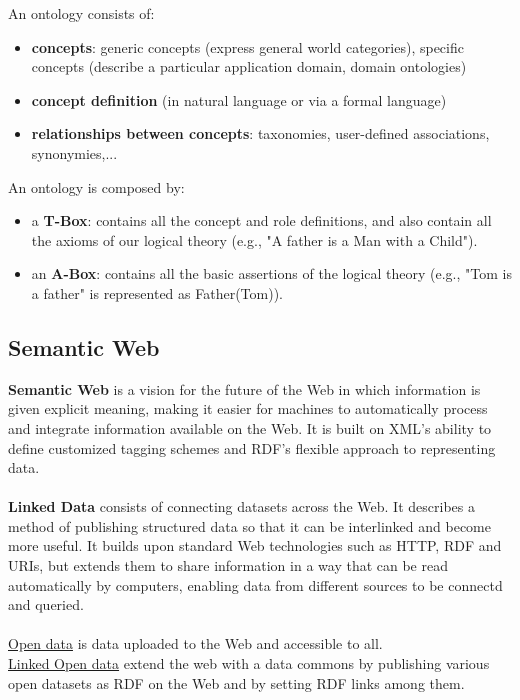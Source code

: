 \documentclass[10pt,a4paper]{article}
\newcommand{\nline}{\\~\\}
\begin{document}
An ontology consists of:
\begin{itemize}
	\item \textbf{concepts}: generic concepts (express general world categories), specific concepts (describe a particular application domain, domain ontologies)
	\item \textbf{concept definition} (in natural language or via a formal language)
	\item \textbf{relationships between concepts}: taxonomies, user-defined associations, synonymies,...
\end{itemize}
An ontology is composed by:
\begin{itemize}
	\item a \textbf{T-Box}: contains all the concept and role definitions, and also contain all the axioms of our logical theory (e.g., "A father is a Man with a Child").
	\item an \textbf{A-Box}: contains all the basic assertions of the logical theory (e.g., "Tom is a father" is represented as Father(Tom)).
\end{itemize}
\pagebreak
\subsection{Semantic Web}
\textbf{Semantic Web} is a vision for the future of the Web in which information is given explicit meaning, making it easier for machines to automatically process and integrate information available on the Web. It is built on XML's ability to define customized tagging schemes and RDF's flexible approach to representing data.
 \nline
\textbf{Linked Data} consists of connecting datasets across the Web. It describes a method of publishing structured data so that it can be interlinked and become more useful. It builds upon standard Web technologies such as HTTP, RDF and URIs, but extends them to share information in a way that can be read automatically by computers, enabling data from different sources to be connectd and queried. \nline
\uline{Open data} is data uploaded to the Web and accessible to all. \\
\uline{Linked Open data} extend the web with a data commons by publishing various open datasets as RDF on the Web and by setting RDF links among them.
\nline
\end{document}
